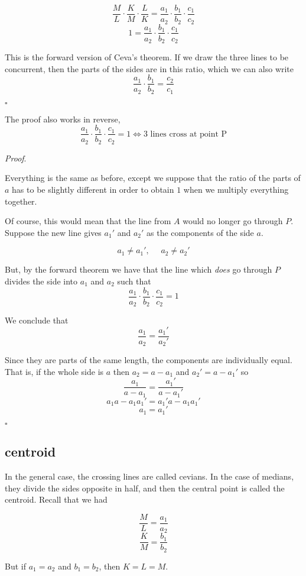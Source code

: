 \documentclass[11pt, oneside]{article}
\begin{document}
\[ \frac{M}{L} \cdot  \frac{K}{M} \cdot  \frac{L}{K} = \frac{a_1}{a_2} \cdot \frac{b_1}{b_2} \cdot  \frac{c_1}{c_2} \]
\[ 1 = \frac{a_1}{a_2} \cdot \frac{b_1}{b_2} \cdot  \frac{c_1}{c_2} \]

This is the forward version of Ceva's theorem.  If we draw the three lines to be concurrent, then the parts of the sides are in this ratio, which we can also write
\[ \frac{a_1}{a_2} \cdot \frac{b_1}{b_2} =  \frac{c_2}{c_1} \]

$\square$

The proof also works in reverse,
\[ \frac{a_1}{a_2} \cdot \frac{b_1}{b_2} \cdot  \frac{c_1}{c_2}  = 1 \iff \text{3 lines cross at point P} \]

\emph{Proof}.

Everything is the same as before, except we suppose that the ratio of the parts of $a$ has to be slightly different in order to obtain $1$ when we multiply everything together.

Of course, this would mean that the line from $A$ would no longer go through $P$.  Suppose the new line gives $a_1'$ and $a_2'$ as the components of the side $a$.

\[ a_1 \ne a_1', \ \ \ \ \ \  a_2 \ne a_2' \]

But, by the forward theorem we have that the line which \emph{does} go through $P$ divides the side into $a_1$ and $a_2$ such that
\[ \frac{a_1}{a_2} \cdot \frac{b_1}{b_2} \cdot  \frac{c_1}{c_2}  = 1 \]

We conclude that
\[ \frac{a_1}{a_2} = \frac{a_1'}{a_2'} \]

Since they are parts of the same length, the components are individually equal.  That is, if the whole side is $a$ then $a_2 = a - a_1$ and $a_2' = a - a_1'$ so
\[ \frac{a_1}{a - a_1} = \frac{a_1'}{a - a_1'} \]
\[ a_1 a - a_1 a_1' = a_1' a - a_1 a_1' \]
\[ a_1 = a_1' \]

$\square$

\subsection*{centroid}

In the general case, the crossing lines are called cevians.  In the case of medians, they divide the sides opposite in half, and then the central point is called the centroid.  Recall that we had

\[ \frac{M}{L} = \frac{a_1}{a_2} \]
\[ \frac{K}{M} = \frac{b_1}{b_2} \]

But if $a_1 = a_2$ and $b_1 = b_2$, then $K = L = M$.  
\end{document}
